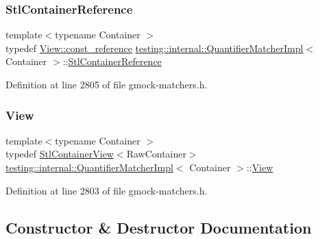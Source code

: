 \subsubsection{\texorpdfstring{Stl\+Container\+Reference}{StlContainerReference}}
{\footnotesize\ttfamily template$<$typename Container $>$ \\
typedef \hyperlink{classtesting_1_1internal_1_1StlContainerView_a9cd4f6ed689b3938cdb7b3c4cbf1b36b}{View\+::const\+\_\+reference} \hyperlink{classtesting_1_1internal_1_1QuantifierMatcherImpl}{testing\+::internal\+::\+Quantifier\+Matcher\+Impl}$<$ Container $>$\+::\hyperlink{classtesting_1_1internal_1_1QuantifierMatcherImpl_a341dd7815b3c6090d935026daac6e938}{Stl\+Container\+Reference}}



Definition at line 2805 of file gmock-\/matchers.\+h.

\mbox{\label{classtesting_1_1internal_1_1QuantifierMatcherImpl_aa1e6b1653b6fdee1b0cfc4c58a9059e6}} 
\subsubsection{\texorpdfstring{View}{View}}
{\footnotesize\ttfamily template$<$typename Container $>$ \\
typedef \hyperlink{classtesting_1_1internal_1_1StlContainerView}{Stl\+Container\+View}$<$Raw\+Container$>$ \hyperlink{classtesting_1_1internal_1_1QuantifierMatcherImpl}{testing\+::internal\+::\+Quantifier\+Matcher\+Impl}$<$ Container $>$\+::\hyperlink{classtesting_1_1internal_1_1QuantifierMatcherImpl_aa1e6b1653b6fdee1b0cfc4c58a9059e6}{View}}



Definition at line 2803 of file gmock-\/matchers.\+h.



\subsection{Constructor \& Destructor Documentation}
\mbox{\label{classtesting_1_1internal_1_1QuantifierMatcherImpl_aef125c9971ea1d02d138cd8fd2af0287}} 
